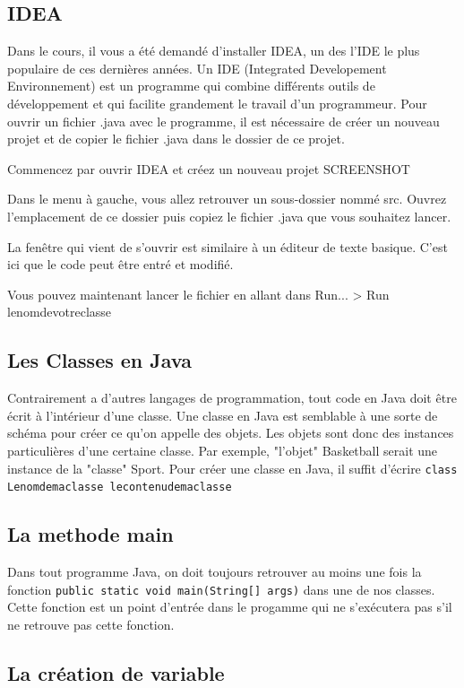 \subsection{IDEA}

Dans le cours, il vous a été demandé d'installer IDEA, un des l'IDE le plus populaire de ces dernières années. Un IDE (Integrated Developement Environnement) est un programme qui combine différents outils de développement et qui facilite grandement le travail d'un programmeur. Pour ouvrir un fichier .java avec le programme, il est nécessaire de créer un nouveau projet et de copier le fichier .java dans le dossier de ce projet.

Commencez par ouvrir IDEA et créez un nouveau projet SCREENSHOT

Dans le menu à gauche, vous allez retrouver un sous-dossier nommé src. Ouvrez l'emplacement de ce dossier puis copiez le fichier .java que vous souhaitez lancer.

La fenêtre qui vient de s'ouvrir est similaire à un éditeur de texte basique. C'est ici que le code peut être entré et modifié.

Vous pouvez maintenant lancer le fichier en allant dans Run... > Run lenomdevotreclasse

\subsection{Les Classes en Java}

Contrairement a d'autres langages de programmation, tout code en Java doit être écrit à l'intérieur d'une classe. Une classe en Java est semblable à une sorte de schéma pour créer ce qu'on appelle des objets. Les objets sont donc des instances particulières d'une certaine classe. Par exemple, "l'objet" Basketball serait une instance de la "classe" Sport. Pour créer une classe en Java, il suffit d'écrire \lstinline{class Lenomdemaclasse lecontenudemaclasse }

\subsection{La methode main}
Dans tout programme Java, on doit toujours retrouver au moins une fois la fonction \lstinline{public static void main(String[] args)} dans une de nos classes. Cette fonction est un point d'entrée dans le progamme qui ne s'exécutera pas s'il ne retrouve pas cette fonction.
\subsection{La création de variable}

